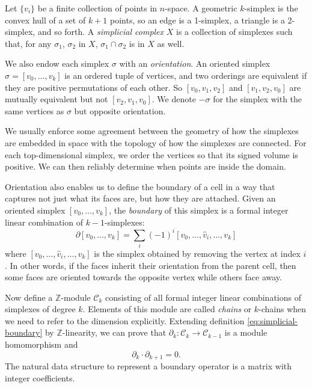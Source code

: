 \documentclass[twocolumn]{article}
\begin{document}
Let $\{v_i\}$ be a finite collection of points in $n$-space.
A geometric $k$-simplex is the convex hull of a set of $k + 1$ points, so an edge is a 1-simplex, a triangle is a 2-simplex, and so forth.
A \emph{simplicial complex} $X$ is a collection of simplexes such that, for any $\sigma_1$, $\sigma_2$ in $X$, $\sigma_1 \cap \sigma_2$ is in $X$ as well.

We also endow each simplex $\sigma$ with an \emph{orientation}.
An oriented simplex $\sigma = [v_0, \ldots, v_k]$ is an ordered tuple of vertices, and two orderings are equivalent if they are positive permutations of each other.
So $[v_0, v_1, v_2]$ and $[v_1, v_2, v_0]$ are mutually equivalent but not $[v_2, v_1, v_0]$.
We denote $-\sigma$ for the simplex with the same vertices as $\sigma$ but opposite orientation.

We usually enforce some agreement between the geometry of how the simplexes are embedded in space with the topology of how the simplexes are connected.
For each top-dimensional simplex, we order the vertices so that its signed volume is positive.
We can then reliably determine when points are inside the domain.

Orientation also enables us to define the boundary of a cell in a way that captures not just what its faces are, but how they are attached.
Given an oriented simplex $[v_0, \ldots, v_k]$, the \emph{boundary} of this simplex is a formal integer linear combination of $k - 1$-simplexes:
\begin{equation}
    \partial[v_0, \ldots, v_k] = \sum_i(-1)^i[v_0, \ldots, \hat v_i, \ldots, v_k]
    \label{eq:simplicial-boundary}
\end{equation}
where $[v_0, \ldots, \hat v_i, \ldots, v_k]$ is the simplex obtained by removing the vertex at index $i$.
In other words, if the faces inherit their orientation from the parent cell, then some faces are oriented towards the opposite vertex while others face away.

Now define a $\mathbb{Z}$-module $\mathscr{C}_k$ consisting of all formal integer linear combinations of simplexes of degree $k$.
Elements of this module are called \emph{chains} or $k$-chains when we need to refer to the dimension explicitly.
Extending definition \eqref{eq:simplicial-boundary} by $\mathbb{Z}$-linearity, we can prove that $\partial_k : \mathscr{C}_k \to \mathscr{C}_{k - 1}$ is a module homomorphism and
\begin{equation}
    \partial_k\cdot\partial_{k + 1} = 0.
    \label{eq:ddzero}
\end{equation}
The natural data structure to represent a boundary operator is a matrix with integer coefficients.
\end{document}
